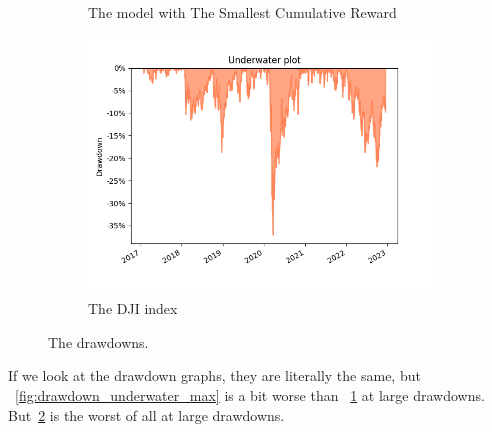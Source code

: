 \documentclass[../xlapes02]{subfiles}
\begin{document}
\begin{figure}[h!]
\begin{subfigure}[t]{0.3\textwidth}
            \caption{The model with The Smallest Cumulative Reward}
            \label{fig:drawdown_underwater_min}
        \end{subfigure}
        \hfill
        \begin{subfigure}[t]{0.3\textwidth}
            \centering
            \includegraphics[width=\linewidth]{image/figure/drawdown_underwater_dji}
            \caption{The DJI index}
            \label{fig:drawdown_underwater_dji}
        \end{subfigure}
        \caption{The drawdowns.}
        \label{fig:Drawdown underwater}
    \end{figure}

    If we look at the drawdown graphs, they are literally the same, but ~\cref{fig:drawdown_underwater_max} is a bit worse than ~\cref{fig:drawdown_underwater_min} at large drawdowns. But~\cref{fig:drawdown_underwater_dji} is the worst of all at large drawdowns.
\end{document}
